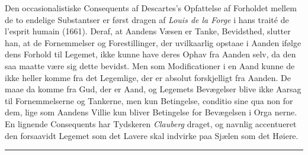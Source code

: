 \documentclass[12pt,a4paper]{book}
\newcommand{\divrule}{\begin{center}\rule{2cm}{0.4pt}\end{center}}
\begin{document}
Den occasionalistiske Consequents af Descartes's Opfattelse
af Forholdet mellem de to endelige Substantser er først dragen
af \emph{Louis de la Forge} i hans traité de l'esprit humain (1661).
Deraf, at Aandens Væsen er Tanke, Bevidsthed, slutter han,
at de Fornemmelser og Forestillinger, der uvilkaarlig opstaae
i Aanden ifølge dens Forhold til Legemet, ikke kunne have
deres Ophav fra Aanden selv, da den saa maatte være sig dette
bevidst. Men som Modificationer i en Aand kunne de ikke
heller komme fra det Legemlige, der er absolut forskjelligt
fra Aanden. De maae da komme fra Gud, der er Aand, og
Legemets Bevægelser blive ikke Aarsag til Fornemmelserne og
Tankerne, men kun Betingelse, conditio sine qua non for dem, lige\-%
som Aandens Villie kun bliver Betingelse for Bevægelsen i Orga\-%
nerne. En lignende Consequents har Tydskeren \emph{Clauberg}
draget, og navnlig accentueret den forsaavidt Legemet som det
Lavere skal indvirke paa Sjælen som det Høiere.

\divrule
\end{document}
